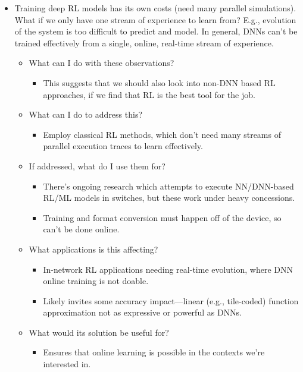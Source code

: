 \documentclass[sigconf,natbib=false]{acmart}
\begin{document}
\begin{itemize}
	\item Training deep RL models has its own costs (need many parallel simulations). What if we only have one stream of experience to learn from? E.g., evolution of the system is too difficult to predict and model. In general, DNNs can't be trained effectively from a single, online, real-time stream of experience.
	\begin{itemize}
		\item What can I do with these observations?
		\begin{itemize}
			\item This suggests that we should also look into non-DNN based RL approaches, if we find that RL is the best tool for the job.
		\end{itemize}
		\item What can I do to address this?
		\begin{itemize}
			\item Employ classical RL methods, which don't need many streams of parallel execution traces to learn effectively.
		\end{itemize}
		\item If addressed, what do I use them for?
		\begin{itemize}
			\item There's ongoing research which attempts to execute NN/DNN-based RL/ML models in switches, but these work under heavy concessions.
			\item Training and format conversion must happen off of the device, so can't be done online.
		\end{itemize}
		\item What applications is this affecting?
		\begin{itemize}
			\item In-network RL applications needing real-time evolution, where DNN online training is not doable.
			\item Likely invites some accuracy impact---linear (e.g., tile-coded) function approximation not as expressive or powerful as DNNs.
		\end{itemize}
		\item What would its solution be useful for?
		\begin{itemize}
			\item Ensures that online learning is possible in the contexts we're interested in.
		\end{itemize}
	\end{itemize}
	

\end{itemize}
\end{document}
